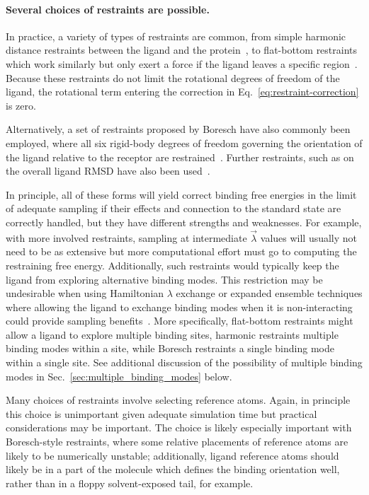\documentclass[9pt,bestpractices]{livecoms}
\begin{document}
\paragraph{Several choices of restraints are possible.}
In practice, a variety of types of restraints are common, from simple harmonic distance restraints between the ligand and the protein~\cite{mobley2006use}, to flat-bottom restraints which work similarly but only exert a force if the ligand leaves a specific region~\cite{chen2007can}.
Because these restraints do not limit the rotational degrees of freedom of the ligand, the rotational term entering the correction in Eq.~\ref{eq:restraint-correction} is zero.

Alternatively, a set of restraints proposed by Boresch have also commonly been employed, where all six rigid-body degrees of freedom governing the orientation of the ligand relative to the receptor are restrained~\cite{boresch2003absolutea, leitgeb2005alchemicala}.
Further restraints, such as on the overall ligand RMSD have also been used~\cite{woo2005calculationa}.

In principle, all of these forms will yield correct binding free energies in the limit of adequate sampling if their effects and connection to the standard state are correctly handled, but they have different strengths and weaknesses.
For example, with more involved restraints, sampling at intermediate $\vec{\lambda}$ values will usually not need to be as extensive but more computational effort must go to computing the restraining free energy.
Additionally, such restraints would typically keep the ligand from exploring alternative binding modes. This  restriction may be undesirable when using Hamiltonian $\lambda$ exchange or expanded ensemble techniques where allowing the ligand to exchange binding modes when it is non-interacting could provide sampling benefits~\cite{wang2013identifying}.
More specifically, flat-bottom restraints might allow a ligand to explore multiple binding sites, harmonic restraints multiple binding modes within a site, while Boresch restraints a single binding mode within a single site.
See additional discussion of the possibility of multiple binding modes in Sec.~\ref{sec:multiple_binding_modes} below.

Many choices of restraints involve selecting reference atoms.
Again, in principle this choice is unimportant given adequate simulation time but practical considerations may be important.
The choice is likely especially important with Boresch-style restraints, where some relative placements of reference atoms are likely to be numerically unstable; additionally, ligand reference atoms should likely be in a part of the molecule which defines the binding orientation well, rather than in a floppy solvent-exposed tail, for example.
\end{document}
